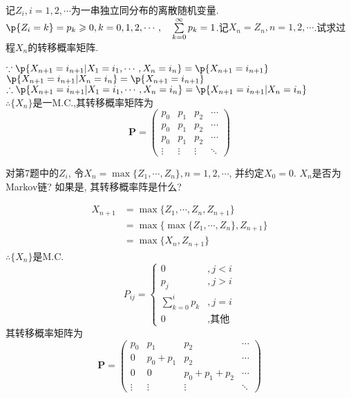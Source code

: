 \begin{problem}{3.7}
记$Z_i,i=1,2,\cdots$为一串独立同分布的离散随机变量.$\p\{Z_i=k\}=p_k \geqslant 0,k=0,1,2,\cdots,\quad \sum\limits^\infty_{k=0}p_k = 1$.记$X_n = Z_n, n = 1, 2, \cdots$.试求过程$X_n$的转移概率矩阵.
\end{problem}
\begin{solution}
	$\because \p\{X_{n+1} = i_{n+1} | X_1 = i_1, \cdots , X_n = i_n\} = \p\{X_{n+1} = i_{n+1}\}$\\
	$\p\{X_{n+1} = i_{n+1} | X_n = i_n\} = \p\{X_{n+1} = i_{n+1}\}$\\
	$\therefore \p\{X_{n+1} = i_{n+1} | X_1 = i_1, \cdots , X_n = i_n\} = \p\{X_{n+1} = i_{n+1} | X_n = i_n\}$\\
	$\therefore \{X_n\}$是一M.C.,其转移概率矩阵为
	\[\bm{P} =
		\begin{pmatrix}
			p_0    & p_1    & p_2    & \cdots \\
			p_0    & p_1    & p_2    & \cdots \\
			p_0    & p_1    & p_2    & \cdots \\
			\vdots & \vdots & \vdots & \ddots
		\end{pmatrix}\]
\end{solution}

\begin{problem}{3.8}
对第7题中的$Z_i$, 令$X_n = \max \{Z_1, \cdots , Z_n\}, n = 1, 2, \cdots$, 并约定$X_0 = 0$. $X_n$是否为Markov链? 如果是, 其转移概率阵是什么?
\end{problem}
\begin{solution}
	\begin{align*}
		X_{n+1} & = \max \{Z_1, \cdots, Z_n, Z_{n+1}\}         \\
		        & = \max \{\max\{Z_1, \cdots, Z_n\}, Z_{n+1}\} \\
		        & = \max \{X_n, Z_{n+1}\}
	\end{align*}
	$\therefore \{X_n\}$是M.C.
	\[
		P_{ij} =
		\begin{cases}
			0                      & , j < i     \\
			p_j                    & , j > i     \\
			\sum\limits^i_{k=0}p_k & , j = i     \\
			0                      & , \text{其他}
		\end{cases}
	\]
	其转移概率矩阵为
	\[
		\bm{P} =
		\begin{pmatrix}
			p_0    & p_1     & p_2         & \cdots \\
			0      & p_0+p_1 & p_2         & \cdots \\
			0      & 0       & p_0+p_1+p_2 & \cdots \\
			\vdots & \vdots  & \vdots      & \ddots
		\end{pmatrix}
	\]
\end{solution}

